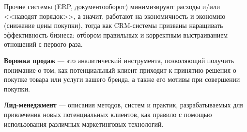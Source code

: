 Прочие системы (ERP, документооборот) минимизируют расходы и/или <<наводят
порядок>>, а значит, работают на экономичность и экономию (снижение цены
покупки), тогда как CRM-системы призваны наращивать эффективность бизнеса:
отбором правильных и корректным выстраиванием отношений с первого раза.

\textbf{Воронка продаж} --- это аналитический инструмента, позволяющий получить
понимание о том, как потенциальный клиент приходит к принятию решения о покупке
товара или услуги вашего бренда, а также его мотивы при совершении покупки.

\textbf{Лид-менеджмент} --- описания методов, систем и практик, разрабатываемых
для привлечения новых потенциальных клиентов, как правило с помощью
использования различных маркетинговых технологий.
